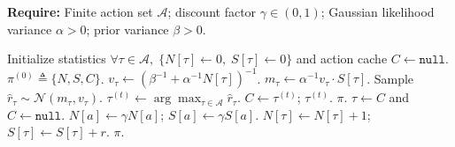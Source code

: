 \begin{algorithm}[t]
\caption{(Non-contextual case) Discounted TS}
\label{alg:dts}
\textbf{Require:} Finite action set $\mathcal A$; discount factor $\gamma\in(0,1)$; Gaussian likelihood variance $\alpha>0$; prior variance $\beta>0$.
\begin{algorithmic}[1]
    \State Initialize statistics $\forall{\tau\in\mathcal A},\;\{N[\tau]\gets 0,\; S[\tau]\gets 0\}$ and action cache $C\gets \texttt{null}$.
    \State \Return $\pi^{(0)} \triangleq \{N,S,C\}$.
\EndProcedure
{}
        \State $v_\tau \gets \left(\beta^{-1}+\alpha^{-1}N[\tau]\right)^{-1}$.
        \State $m_\tau \gets \alpha^{-1} v_\tau \cdot S[\tau]$.
        \State Sample $\hat{r}_\tau \sim \mathcal N(m_\tau,v_\tau)$.
    \EndFor
    \State $\tau^{(t)} \gets \arg\max_{\tau\in\mathcal A}\hat{r}_\tau$.
    \State $C\gets \tau^{(t)}$; \Return $\tau^{(t)}$.
\EndProcedure
{}
     \State \Return $\pi$. \EndIf
    \State $\tau \gets C$ and $C\gets \texttt{null}$.
     \State $N[a]\gets \gamma N[a]$; \;\; $S[a]\gets \gamma S[a]$. \EndFor
    \State $N[\tau]\gets N[\tau]+1$; \;\; $S[\tau]\gets S[\tau]+r$.
    \State \Return $\pi$.
\EndProcedure
\end{algorithmic}
\end{algorithm}